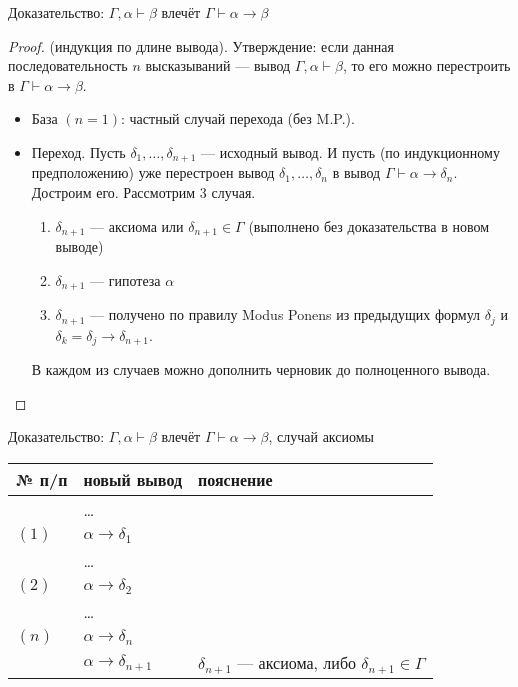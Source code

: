 \documentclass[aspectratio=169]{beamer}
\begin{document}
\begin{frame}{Доказательство: $\Gamma,\alpha\vdash\beta$ влечёт $\Gamma\vdash\alpha\rightarrow\beta$}

\begin{proof} (индукция по длине вывода). Утверждение: если данная последовательность $n$ высказываний --- вывод
$\Gamma,\alpha\vdash\beta$, то его можно перестроить в $\Gamma\vdash\alpha\rightarrow\beta$.

\begin{itemize}
\item База $(n=1)$: частный случай перехода (без M.P.).

\item Переход. Пусть $\delta_1, \dots, \delta_{n+1}$ --- исходный вывод. И пусть (по индукционному предположению)
уже перестроен вывод $\delta_1, \dots, \delta_n$ в вывод $\Gamma\vdash\alpha\rightarrow\delta_n$.
Достроим его. Рассмотрим 3 случая.

\begin{enumerate}
\item $\delta_{n+1}$ --- аксиома или $\delta_{n+1} \in \Gamma$ (выполнено без доказательства в новом выводе)\pause
\item $\delta_{n+1}$ --- гипотеза $\alpha$\pause
\item $\delta_{n+1}$ --- получено по правилу Modus Ponens из предыдущих формул $\delta_j$ и 
$\delta_k = \delta_j\rightarrow\delta_{n+1}$.
\end{enumerate}

В каждом из случаев можно дополнить черновик до полноценного вывода.
\end{itemize}\end{proof}

\end{frame}

\begin{frame}{Доказательство: $\Gamma,\alpha\vdash\beta$ влечёт $\Gamma\vdash\alpha\rightarrow\beta$, случай аксиомы}
\begin{tabular}{lll}
№ п/п & новый вывод & пояснение \\
\hline
& \dots\\
$(1)$ & $\alpha\rightarrow\delta_1$ \\
& \dots\\
$(2)$ & $\alpha\rightarrow\delta_2$ \\
    & \dots \\
$(n)$ & $\alpha\rightarrow\delta_n$ \\
 & \color{cyan}$\alpha\rightarrow\delta_{n+1}$ & \color{cyan}$\delta_{n+1}$ --- аксиома, либо $\delta_{n+1} \in \Gamma$\\
\end{tabular}
\end{frame}
\end{document}
